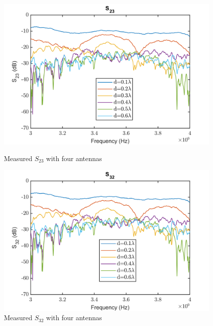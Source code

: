 \begin{figure}[H]
  \centering
  \begin{minipage}[b]{0.5\textwidth}
	\includegraphics[scale = 0.5]{figures/measurement/antennas/spar_four_ant_s23.png}
	\caption{Measured $S_{23}$ with four antennas}
    \label{fig:chamber_four_ant_s23}
  \end{minipage}
  \hfill
  \begin{minipage}[b]{0.4\textwidth}
\includegraphics[scale = 0.5]{figures/measurement/antennas/spar_four_ant_s32.png}
\caption{Measured $S_{32}$ with four antennas}
    \label{fig:chamber_four_ant_s32}
  \end{minipage}
\end{figure}





